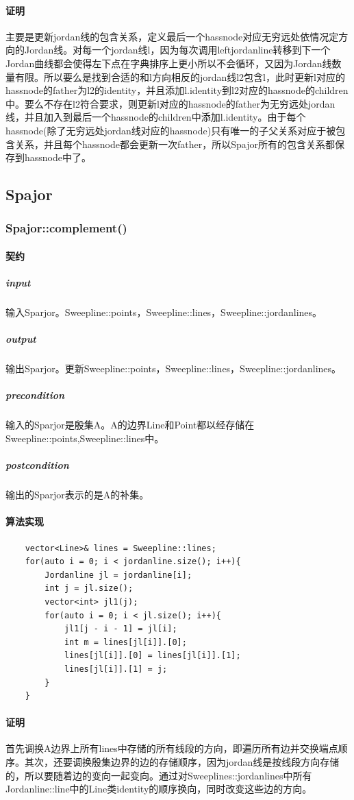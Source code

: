 \documentclass[a4paper]{book}
\numberwithin{equation}{chapter}
\theoremstyle{definition}
\begin{document}
\paragraph{证明}
主要是更新jordan线的包含关系，定义最后一个hassnode对应无穷远处依情况定方向的Jordan线。对每一个jordan线l，因为每次调用leftjordanline转移到下一个Jordan曲线都会使得左下点在字典排序上更小所以不会循环，又因为Jordan线数量有限。所以要么是找到合适的和l方向相反的jordan线l2包含l，此时更新l对应的hassnode的father为l2的identity，并且添加l.identity到l2对应的hassnode的children中。要么不存在l2符合要求，则更新l对应的hassnode的father为无穷远处jordan线，并且加入到最后一个hassnode的children中添加l.identity。由于每个hassnode(除了无穷远处jordan线对应的hassnode)只有唯一的子父关系对应于被包含关系，并且每个hassnode都会更新一次father，所以Spajor所有的包含关系都保存到hassnode中了。

\subsection{Spajor}
\subsubsection{Spajor::complement()}
\paragraph{契约}
\subparagraph{input}
输入Sparjor。Sweepline::points，Sweepline::lines，Sweepline::jordanlines。
\subparagraph{output}
输出Sparjor。更新Sweepline::points，Sweepline::lines，Sweepline::jordanlines。
\subparagraph{precondition}
输入的Sparjor是殷集A。A的边界Line和Point都以经存储在Sweepline::points,Sweepline::lines中。
\subparagraph{postcondition}
输出的Sparjor表示的是A的补集。
\paragraph{算法实现}
\begin{lstlisting}
	vector<Line>& lines = Sweepline::lines;
	for(auto i = 0; i < jordanline.size(); i++){
		Jordanline jl = jordanline[i];
		int j = jl.size();
		vector<int> jl1(j);
		for(auto i = 0; i < jl.size(); i++){
			jl1[j - i - 1] = jl[i];
			int m = lines[jl[i]].[0];
			lines[jl[i]].[0] = lines[jl[i]].[1];
			lines[jl[i]].[1] = j;
		}
	}
\end{lstlisting}
\paragraph{证明}
首先调换A边界上所有lines中存储的所有线段的方向，即遍历所有边并交换端点顺序。其次，还要调换殷集边界的边的存储顺序，因为jordan线是按线段方向存储的，所以要随着边的变向一起变向。通过对Sweeplines::jordanlines中所有Jordanline::line中的Line类identity的顺序换向，同时改变这些边的方向。
\end{document}
